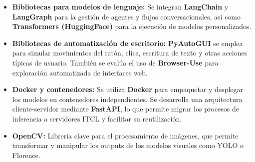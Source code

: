 \begin{itemize}
    \item \textbf{Bibliotecas para modelos de lenguaje:} Se integran \textbf{LangChain} y \textbf{LangGraph} para la gestión de agentes y flujos conversacionales, así como \textbf{Transformers (HuggingFace)} para la ejecución de modelos personalizados.

    \item \textbf{Bibliotecas de automatización de escritorio:} \textbf{PyAutoGUI} se emplea para simular movimientos del ratón, clics, escritura de texto y otras acciones típicas de usuario. También se evalúa el uso de \textbf{Browser-Use} para exploración automatizada de interfaces web.

    \item \textbf{Docker y contenedores:} Se utiliza \textbf{Docker} para empaquetar y desplegar los modelos en contenedores independientes. Se desarrolla una arquitectura cliente-servidor mediante \textbf{FastAPI}, lo que permite migrar los procesos de inferencia a servidores ITCL y facilitar su reutilización.

    \item \textbf{OpenCV:} Librería clave para el procesamiento de imágenes, que permite transformar y manipular los outputs de los modelos visuales como YOLO o Florence.
    
\end{itemize}
